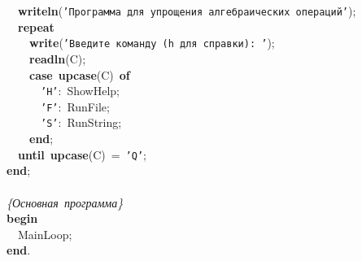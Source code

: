 \mbox{}\ \ \textbf{writeln}(\texttt{'Программа\ для\ упрощения\ алгебраических\ операций'}); \\
\mbox{}\ \ \textbf{repeat} \\
\mbox{}\ \ \ \ \textbf{write}(\texttt{'Введите\ команду\ (h\ для\ справки):\ '}); \\
\mbox{}\ \ \ \ \textbf{readln}(C); \\
\mbox{}\ \ \ \ \textbf{case}\ \textbf{upcase}(C)\ \textbf{of} \\
\mbox{}\ \ \ \ \ \ \texttt{'H'}:\ ShowHelp; \\
\mbox{}\ \ \ \ \ \ \texttt{'F'}:\ RunFile; \\
\mbox{}\ \ \ \ \ \ \texttt{'S'}:\ RunString; \\
\mbox{}\ \ \ \ \textbf{end}; \\
\mbox{}\ \ \textbf{until}\ \textbf{upcase}(C)\ =\ \texttt{'Q'}; \\
\mbox{}\textbf{end}; \\
\mbox{} \\
\mbox{}\textit{\{Основная\ программа\}} \\
\mbox{}\textbf{begin} \\
\mbox{}\ \ MainLoop; \\
\mbox{}\textbf{end}. \\
\mbox{} \\
\mbox{}
